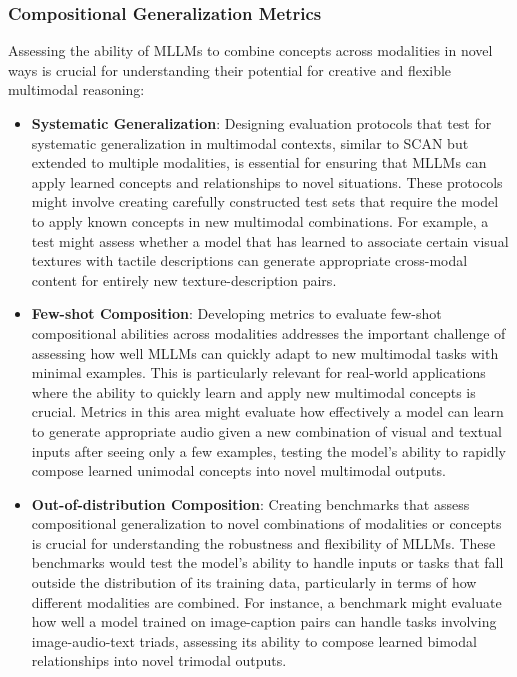 \subsubsection{Compositional Generalization Metrics}
Assessing the ability of MLLMs to combine concepts across modalities in novel ways is crucial for understanding their potential for creative and flexible multimodal reasoning:

\begin{itemize}
    \item \textbf{Systematic Generalization}: Designing evaluation protocols that test for systematic generalization in multimodal contexts, similar to SCAN \citep{lake2018generalization} but extended to multiple modalities, is essential for ensuring that MLLMs can apply learned concepts and relationships to novel situations. These protocols might involve creating carefully constructed test sets that require the model to apply known concepts in new multimodal combinations. For example, a test might assess whether a model that has learned to associate certain visual textures with tactile descriptions can generate appropriate cross-modal content for entirely new texture-description pairs.

    \item \textbf{Few-shot Composition}: Developing metrics to evaluate few-shot compositional abilities across modalities addresses the important challenge of assessing how well MLLMs can quickly adapt to new multimodal tasks with minimal examples. This is particularly relevant for real-world applications where the ability to quickly learn and apply new multimodal concepts is crucial. Metrics in this area might evaluate how effectively a model can learn to generate appropriate audio given a new combination of visual and textual inputs after seeing only a few examples, testing the model's ability to rapidly compose learned unimodal concepts into novel multimodal outputs.

    \item \textbf{Out-of-distribution Composition}: Creating benchmarks that assess compositional generalization to novel combinations of modalities or concepts is crucial for understanding the robustness and flexibility of MLLMs. These benchmarks would test the model's ability to handle inputs or tasks that fall outside the distribution of its training data, particularly in terms of how different modalities are combined. For instance, a benchmark might evaluate how well a model trained on image-caption pairs can handle tasks involving image-audio-text triads, assessing its ability to compose learned bimodal relationships into novel trimodal outputs.
\end{itemize}

